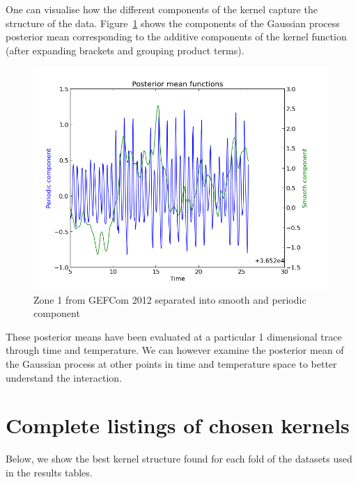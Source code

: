 \documentclass[twoside]{article}
\begin{document}
One can visualise how the different components of the kernel capture the structure of the data.
Figure~\ref{fig:gef_z01_two_means} shows the components of the Gaussian process posterior mean corresponding to the additive components of the kernel function (after expanding brackets and grouping product terms).

\begin{figure}
\includegraphics[width=0.5\columnwidth]{../figures/gef_load_z01_500_posteriors}
\caption{Zone 1 from GEFCom 2012 separated into smooth and periodic component}
\label{fig:gef_z01_two_means}
\end{figure}

These posterior means have been evaluated at a particular 1 dimensional trace through time and temperature.
We can however examine the posterior mean of the Gaussian process at other points in time and temperature space to better understand the interaction.


\section{Complete listings of chosen kernels}

Below, we show the best kernel structure found for each fold of the datasets used in the results tables.

%
%
%





\end{document}
